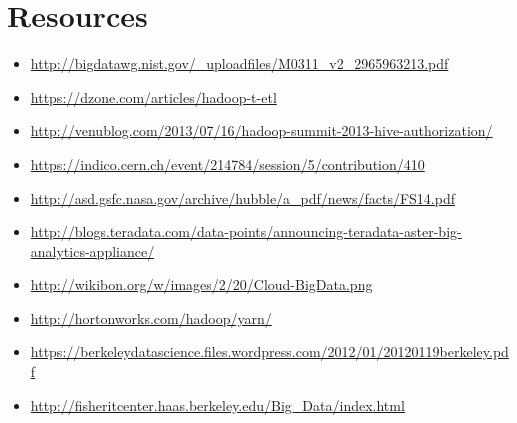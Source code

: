 \section{Resources}\label{resources-4}

\begin{itemize}
\item
  \url{http://bigdatawg.nist.gov/_uploadfiles/M0311_v2_2965963213.pdf}
\item
  \url{https://dzone.com/articles/hadoop-t-etl}
\item
  \url{http://venublog.com/2013/07/16/hadoop-summit-2013-hive-authorization/}
\item
  \url{https://indico.cern.ch/event/214784/session/5/contribution/410}
\item
  \url{http://asd.gsfc.nasa.gov/archive/hubble/a_pdf/news/facts/FS14.pdf}
\item
  \url{http://blogs.teradata.com/data-points/announcing-teradata-aster-big-analytics-appliance/}
\item
  \url{http://wikibon.org/w/images/2/20/Cloud-BigData.png}
\item
  \url{http://hortonworks.com/hadoop/yarn/}
\item
  \url{https://berkeleydatascience.files.wordpress.com/2012/01/20120119berkeley.pdf}
\item
  \url{http://fisheritcenter.haas.berkeley.edu/Big_Data/index.html}
\end{itemize}
